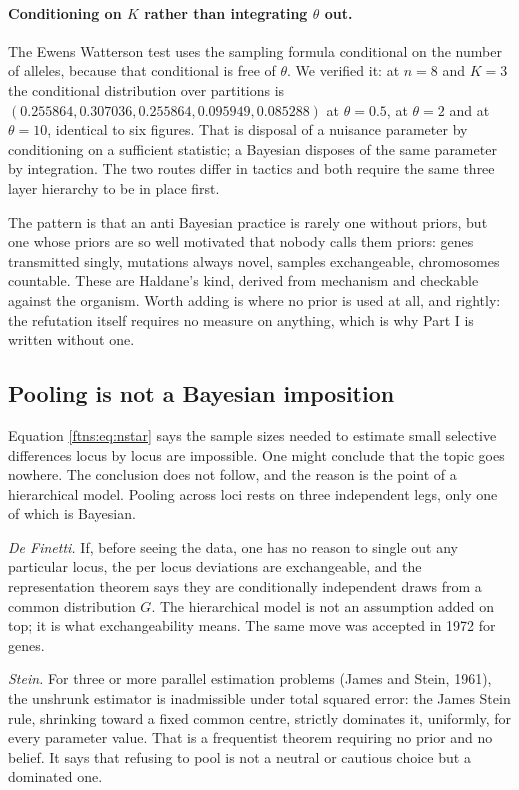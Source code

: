 \paragraph{Conditioning on $K$ rather than integrating $\theta$ out.} The Ewens Watterson test
uses the sampling formula conditional on the number of alleles, because that conditional is free of
$\theta$. We verified it: at $n=8$ and $K=3$ the conditional distribution over partitions is
$(0.255864,0.307036,0.255864,0.095949,0.085288)$ at $\theta=0.5$, at $\theta=2$ and at $\theta=10$,
identical to six figures. That is disposal of a nuisance parameter by conditioning on a sufficient
statistic; a Bayesian disposes of the same parameter by integration. The two routes differ in
tactics and both require the same three layer hierarchy to be in place first.

The pattern is that an anti Bayesian practice is rarely one without priors, but one whose priors
are so well motivated that nobody calls them priors: genes transmitted singly, mutations always
novel, samples exchangeable, chromosomes countable. These are Haldane's kind, derived from mechanism
and checkable against the organism. Worth adding is where no prior is used at all, and rightly: the
refutation itself requires no measure on anything, which is why Part I is written without one.

\subsection{Pooling is not a Bayesian imposition}

Equation \eqref{ftns:eq:nstar} says the sample sizes needed to estimate small selective differences
locus by locus are impossible. One might conclude that the topic goes nowhere. The conclusion does
not follow, and the reason is the point of a hierarchical model. Pooling across loci rests on three
independent legs, only one of which is Bayesian.

\emph{De Finetti.} If, before seeing the data, one has no reason to single out any particular
locus, the per locus deviations are exchangeable, and the representation theorem says they are
conditionally independent draws from a common distribution $G$. The hierarchical model is not an
assumption added on top; it is what exchangeability means. The same move was accepted in 1972 for
genes.

\emph{Stein.} For three or more parallel estimation problems (James and Stein, 1961), the
unshrunk estimator is
inadmissible under total squared error: the James Stein rule, shrinking toward a fixed common centre, strictly dominates it,
uniformly, for every parameter value. That is a frequentist theorem requiring no prior and no
belief. It says that refusing to pool is not a neutral or cautious choice but a dominated one.

